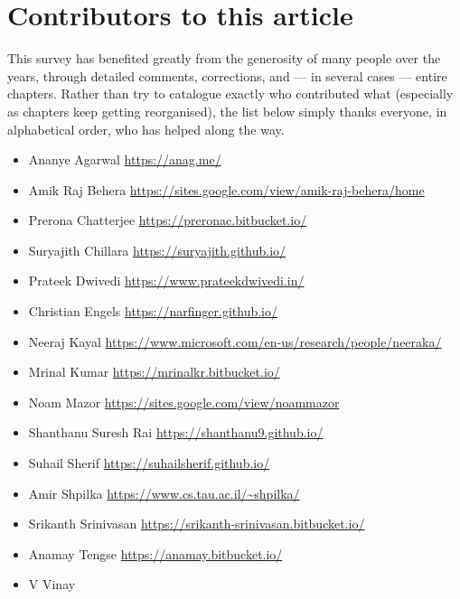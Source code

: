 \chapter*{Contributors to this article}

This survey has benefited greatly from the generosity of many people over the years, through detailed comments, corrections, and --- in several cases --- entire chapters. Rather than try to catalogue exactly who contributed what (especially as chapters keep getting reorganised), the list below simply thanks everyone, in alphabetical order, who has helped along the way.

\begin{itemize}
\item Ananye Agarwal \url{https://anag.me/}

\item Amik Raj Behera \url{https://sites.google.com/view/amik-raj-behera/home}

\item Prerona Chatterjee \hfill \url{https://preronac.bitbucket.io/}

\item Suryajith Chillara \hfill \url{https://suryajith.github.io/}

\item Prateek Dwivedi \hfill \url{https://www.prateekdwivedi.in/}

\item Christian Engels \hfill \url{https://narfinger.github.io/}

\item Neeraj Kayal \hfill \url{https://www.microsoft.com/en-us/research/people/neeraka/}

\item Mrinal Kumar \hfill \url{https://mrinalkr.bitbucket.io/}

\item Noam Mazor \hfill \url{https://sites.google.com/view/noammazor}

\item Shanthanu Suresh Rai \hfill \url{https://shanthanu9.github.io/}

\item Suhail Sherif \hfill \url{https://suhailsherif.github.io/}

\item Amir Shpilka \hfill \url{https://www.cs.tau.ac.il/~shpilka/}

\item Srikanth Srinivasan \hfill \url{https://srikanth-srinivasan.bitbucket.io/}

\item Anamay Tengse \hfill \url{https://anamay.bitbucket.io/}

\item V Vinay

\end{itemize}
